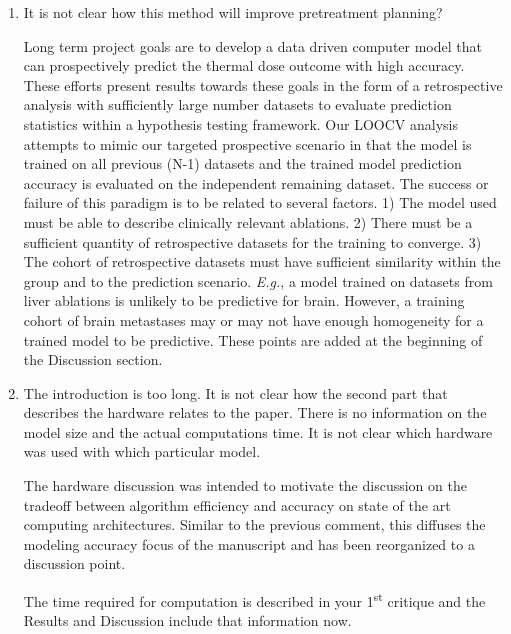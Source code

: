 \documentclass[letterpaper,12pt]{report}
\begin{document}
\begin{enumerate}
{}
\item
It is not clear how this method will improve pretreatment planning?

{\color{red}
Long term project goals are to develop a data driven computer model
that can prospectively predict the thermal dose outcome with high
accuracy. These efforts present results towards these goals
in the form of a retrospective analysis
with sufficiently large number datasets to evaluate prediction
statistics within a hypothesis testing framework. 
Our LOOCV analysis attempts to mimic our targeted prospective scenario
in that the model is trained on all previous (N-1) datasets and
the trained model prediction accuracy is evaluated on the
independent remaining dataset.
The success or failure of this paradigm is
to be related to several factors. 1) The model used must be able to
describe clinically relevant ablations. 2) There must be a sufficient
quantity of retrospective datasets for the
training to converge. 3) The cohort of retrospective datasets must have sufficient similarity within the
group and to the prediction scenario. \textit{E.g.}, a model trained on datasets from liver ablations is unlikely to
be predictive for brain. However, a training cohort of brain
metastases may or may not have enough homogeneity for a trained model
to be predictive. These points are added at the beginning of
the Discussion section.
}
\item
The introduction is too long. It is not clear how the second part that
describes the hardware relates to the paper.  There is no information
on the model size and the actual computations time.
It is not clear which hardware was used with which particular model. 

{\color{red}
The hardware discussion was intended to
motivate the discussion on the tradeoff between algorithm efficiency and
accuracy on state of the art computing architectures. 
Similar to the previous comment, this diffuses the modeling accuracy focus of the 
manuscript and has been reorganized to a discussion point.

The time required for computation is described in your
1\textsuperscript{st} critique and the Results and Discussion include that information now.

}
\end{enumerate}
\end{document}
